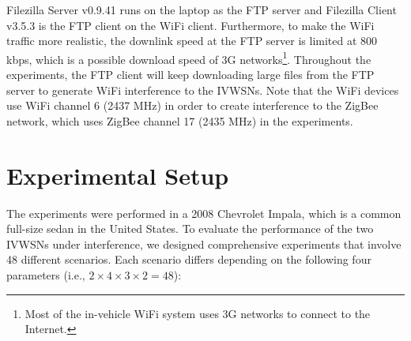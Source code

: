 \documentclass[journal]{IEEEtran}
\begin{document}
Filezilla Server v0.9.41 runs on the laptop as the FTP server and Filezilla Client v3.5.3 is the FTP client on the WiFi client. Furthermore, to make the WiFi traffic more realistic, the downlink speed at the FTP server is limited at 800 kbps, which is a possible download speed of 3G networks\footnote{Most of the in-vehicle WiFi system uses 3G networks to connect to the Internet.}. Throughout the experiments, the FTP client will keep downloading large files from the FTP server to generate WiFi interference to the IVWSNs. Note that the WiFi devices use WiFi channel 6 (2437 MHz) in order to create interference to the ZigBee network, which uses ZigBee channel 17 (2435 MHz) in the experiments.















\section{Experimental Setup}
The experiments were performed in a 2008 Chevrolet Impala, which is a common full-size sedan in the United States. To evaluate the performance of the two IVWSNs under interference, we designed comprehensive experiments that involve 48 different scenarios. Each scenario differs depending on the following four parameters (i.e., $2\times 4\times 3\times 2 = 48$):
\end{document}

